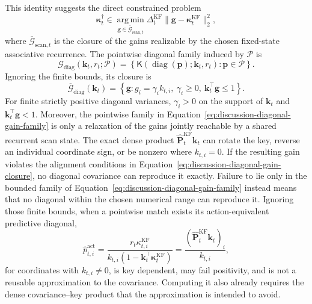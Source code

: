 \documentclass[11pt]{article}
\newcommand{\vct}[1]{\boldsymbol{#1}}
\newcommand{\diag}{\operatorname{diag}}
\begin{document}
This identity suggests the direct constrained problem
\begin{equation}
  \vct{\kappa}_t^\dagger
  \in\operatorname*{arg\,min}_{\vct{g}\in\overline{\mathcal{G}}_{\mathrm{scan},t}}
    \Delta_t^{\mathrm{KF}}
    \|\vct{g}-\vct{\kappa}_t^{\mathrm{KF}}\|_2^2,
  \label{eq:discussion-direct-gain-projection}
\end{equation}
where $\overline{\mathcal{G}}_{\mathrm{scan},t}$ is the closure of the gains realizable by the
chosen fixed-state associative recurrence. The pointwise diagonal family induced by
$\mathcal{P}$ is
\begin{equation}
  \mathcal{G}_{\mathrm{diag}}(\vct{k}_t,r_t;\mathcal{P})
  =\left\{
    \mathsf{K}(\diag(\vct{p});\vct{k}_t,r_t):
    \vct{p}\in\mathcal{P}
  \right\}.
  \label{eq:discussion-diagonal-gain-family}
\end{equation}
Ignoring the finite bounds, its closure is
\begin{equation}
  \overline{\mathcal{G}}_{\mathrm{diag}}(\vct{k}_t)
  =\left\{
    \vct{g}:g_i=\gamma_i k_{t,i},\ \gamma_i\geq0,\
    \vct{k}_t^\top\vct{g}\leq1
  \right\}.
  \label{eq:discussion-diagonal-gain-closure}
\end{equation}
For finite strictly positive diagonal variances, $\gamma_i>0$ on the support of $\vct{k}_t$ and
$\vct{k}_t^\top\vct{g}<1$. Moreover, the pointwise family in
Equation~\eqref{eq:discussion-diagonal-gain-family} is only a relaxation of the gains jointly
reachable by a shared recurrent scan state.
The exact dense product $\widehat{\vct{P}}_t^{\mathrm{KF}}\vct{k}_t$ can rotate the key, reverse an
individual coordinate sign, or be nonzero where $k_{t,i}=0$. If the resulting gain violates the
alignment conditions in Equation~\eqref{eq:discussion-diagonal-gain-closure}, no diagonal
covariance can reproduce it exactly. Failure to lie only in the bounded family of
Equation~\eqref{eq:discussion-diagonal-gain-family} instead means that no diagonal within the
chosen numerical range can reproduce it. Ignoring those finite bounds, when a pointwise match exists its
action-equivalent predictive diagonal,
\begin{equation}
  \widehat p_{t,i}^{\mathrm{act}}
  =\frac{r_t\kappa_{t,i}^{\mathrm{KF}}}
    {k_{t,i}(1-\vct{k}_t^\top\vct{\kappa}_t^{\mathrm{KF}})}
  =\frac{(\widehat{\vct{P}}_t^{\mathrm{KF}}\vct{k}_t)_i}{k_{t,i}},
  \label{eq:discussion-action-equivalent-current-diagonal}
\end{equation}
for coordinates with $k_{t,i}\neq0$, is key dependent, may fail positivity, and is not a reusable
approximation to the covariance. Computing it also already requires the dense covariance--key
product that the approximation is intended to avoid.
\end{document}
